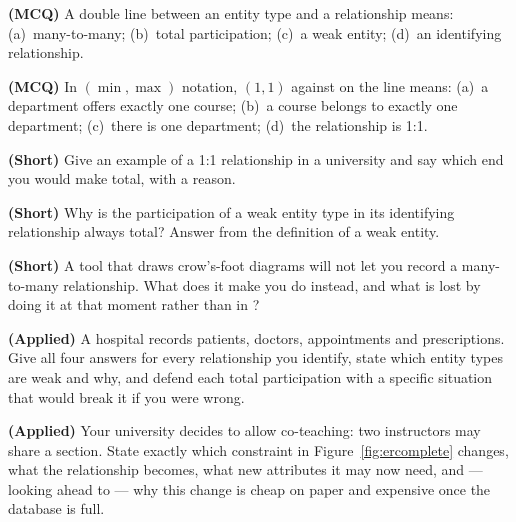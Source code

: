 \begin{reviewq}
  \item \textbf{(MCQ)} A double line between an entity type and a relationship
        means: (a)~many-to-many; (b)~total participation; (c)~a weak entity;
        (d)~an identifying relationship.
  \item \textbf{(MCQ)} In $(\min,\max)$ notation, $(1,1)$ against
         on the  line means: (a)~a department
        offers exactly one course; (b)~a course belongs to exactly one
        department; (c)~there is one department; (d)~the relationship is 1:1.
  \item \textbf{(Short)} Give an example of a 1:1 relationship in a university
        and say which end you would make total, with a reason.
  \item \textbf{(Short)} Why is the participation of a weak entity type in its
        identifying relationship always total? Answer from the definition of a
        weak entity.
  \item \textbf{(Short)} A tool that draws crow's-foot diagrams will not let
        you record a many-to-many relationship. What does it make you do
        instead, and what is lost by doing it at that moment rather than in
        ?
  \item \textbf{(Applied)} A hospital records patients, doctors, appointments
        and prescriptions. Give all four answers for every relationship you
        identify, state which entity types are weak and why, and defend each
        total participation with a specific situation that would break it if
        you were wrong.
  \item \textbf{(Applied)} Your university decides to allow co-teaching: two
        instructors may share a section. State exactly which constraint in
        Figure~\ref{fig:ercomplete} changes, what the relationship becomes,
        what new attributes it may now need, and --- looking ahead to
         --- why this change is cheap on paper and expensive
        once the database is full.
\end{reviewq}
